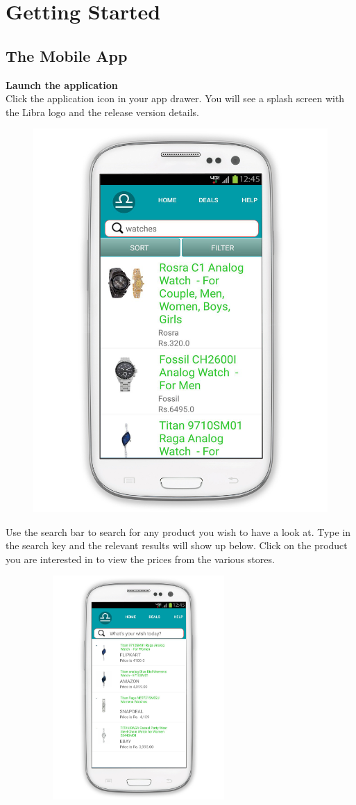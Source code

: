 \chapter{Getting Started}
\section{The Mobile App} 

  \textbf{\large Launch the application}\\
\vspace{2mm}
	\setlength{\parindent}{1ex}Click the application icon in your app drawer. You will see a splash screen with the Libra logo and the release version details.

\begin{figure}[h!]
\centering
\includegraphics[width=0.5\linewidth]{figure/search.png}
\end{figure}

\vspace{1mm}
Use the search bar to search for any product you wish to have a look at. Type in the search key and the relevant results will show up below. Click on the product you are interested in to view the prices from the various stores.

\newpage


\begin{figure}[h!]
\centering
\includegraphics[width=8cm, height=8.5cm]{figure/compare.png}
\end{figure}

